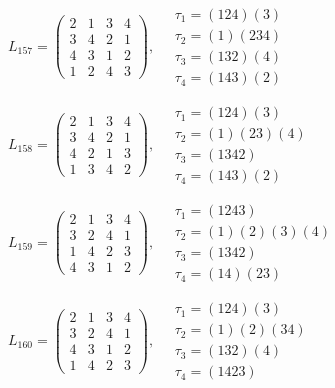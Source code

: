 $L_{157} = \begin{pmatrix} 2 & 1 & 3 & 4 \\ 3 & 4 & 2 & 1 \\ 4 & 3 & 1 & 2 \\ 1 & 2 & 4 & 3 \end{pmatrix}, \quad \begin{matrix} \tau_{1} = (1 2 4)(3) \\ \tau_{2} = (1)(2 3 4) \\ \tau_{3} = (1 3 2)(4) \\ \tau_{4} = (1 4 3)(2) \end{matrix}$

$L_{158} = \begin{pmatrix} 2 & 1 & 3 & 4 \\ 3 & 4 & 2 & 1 \\ 4 & 2 & 1 & 3 \\ 1 & 3 & 4 & 2 \end{pmatrix}, \quad \begin{matrix} \tau_{1} = (1 2 4)(3) \\ \tau_{2} = (1)(2 3)(4) \\ \tau_{3} = (1 3 4 2) \\ \tau_{4} = (1 4 3)(2) \end{matrix}$

$L_{159} = \begin{pmatrix} 2 & 1 & 3 & 4 \\ 3 & 2 & 4 & 1 \\ 1 & 4 & 2 & 3 \\ 4 & 3 & 1 & 2 \end{pmatrix}, \quad \begin{matrix} \tau_{1} = (1 2 4 3) \\ \tau_{2} = (1)(2)(3)(4) \\ \tau_{3} = (1 3 4 2) \\ \tau_{4} = (1 4)(2 3) \end{matrix}$

$L_{160} = \begin{pmatrix} 2 & 1 & 3 & 4 \\ 3 & 2 & 4 & 1 \\ 4 & 3 & 1 & 2 \\ 1 & 4 & 2 & 3 \end{pmatrix}, \quad \begin{matrix} \tau_{1} = (1 2 4)(3) \\ \tau_{2} = (1)(2)(3 4) \\ \tau_{3} = (1 3 2)(4) \\ \tau_{4} = (1 4 2 3) \end{matrix}$

